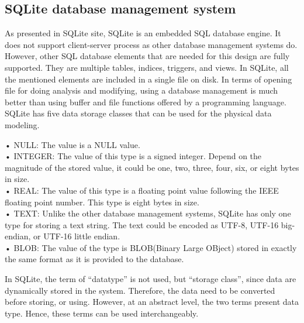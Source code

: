 \subsection{SQLite database management system}
As presented in SQLite site\cite{SQLITEORG}, SQLite is an embedded SQL database engine. It does not support client-server process as other database management systems do. However, other SQL database elements that are needed for this design are fully supported. They are multiple tables, indices, triggers, and views. In SQLite, all the mentioned elements are included in a single file on disk. In terms of opening file for doing analysis and modifying, using a database management is much better than using buffer and file functions offered by a programming language.\\
SQLite has five data storage classes that can be used for the physical data modeling.
\begin{adjustwidth}{1cm}{}
•	NULL: The value is a NULL value.\\
•	INTEGER: The value of this type is a signed integer. Depend on the magnitude of the stored value, it could be one, two, three, four, six, or eight bytes in size.\\
•	REAL: The value of this type is a floating point value following the IEEE floating point number. This type is eight bytes in size.\\
•	TEXT: Unlike the other database management systems, SQLite has only one type for storing a text string. The text could be encoded as UTF-8, UTF-16 big-endian, or UTF-16 little endian.\\
•	BLOB: The value of the type is BLOB(Binary Large OBject) stored in exactly the same format as it is provided to the database.
\end{adjustwidth}
In SQLite, the term of “datatype” is not used, but “storage class”, since data are dynamically stored in the system. Therefore, the data need to be converted before storing, or using. However, at an abstract level, the two terms present data type. Hence, these terms can be used interchangeably.
